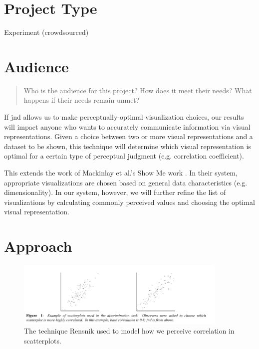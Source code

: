 \documentclass{proc}
\begin{document}
\section{Project Type}

Experiment (crowdsourced)

\section{Audience} 
\begin{quote}
Who is the audience for this project? 
How does it meet their needs? 
What happens if their needs remain unmet?
\end{quote}

If jnd allows us to make perceptually-optimal visualization choices, our results will impact anyone who wants to accurately communicate information via visual representations.
Given a choice between two or more visual representations and a dataset to be shown, this technique will determine which visual representation is optimal for a certain type of perceptual judgment (e.g. correlation coefficient).

This extends the work of Mackinlay et al.'s Show Me work \cite{Mackinlay2007}.
In their system, appropriate visualizations are chosen based on general data characteristics (e.g. dimensionality). 
In our system, however, we will further refine the list of visualizations by calculating commonly perceived values and choosing the optimal visual representation.

\section{Approach}

\begin{figure}[t]
  \centering
    \includegraphics[width=0.9\textwidth]{img/technique}
    \caption{The technique Rensnik used to model how we perceive correlation in scatterplots.}
  \label{fig:technique}
\end{figure}
\end{document}
